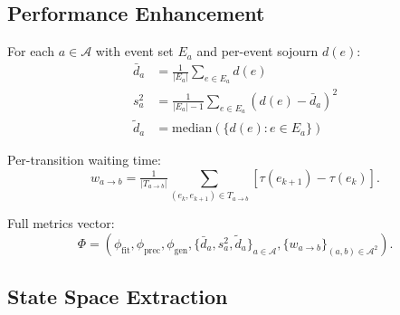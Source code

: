 \subsection{Performance Enhancement}
\label{sec:s2-enhancement}

\begin{definition}
\label{def:performance-metrics}
For each $a \in \mathcal{A}$ with event set $E_a$ and per-event sojourn
$d(e)$:
\begin{align}
\bar{d}_a   &= \tfrac{1}{|E_a|} \sum_{e \in E_a} d(e)   \label{eq:mean-sojourn} \\
s_a^2       &= \tfrac{1}{|E_a|-1} \sum_{e \in E_a} (d(e) - \bar{d}_a)^2 \label{eq:var-sojourn} \\
\tilde{d}_a &= \text{median}(\{d(e) : e \in E_a\})       \label{eq:median-sojourn}
\end{align}
\end{definition}

Per-transition waiting time:
\begin{equation}
\label{eq:waiting-time}
w_{a \to b} = \tfrac{1}{|T_{a \to b}|} \sum_{(e_k, e_{k+1}) \in T_{a \to b}}
    [\tau(e_{k+1}) - \tau(e_k)].
\end{equation}

Full metrics vector:
\begin{equation}
\label{eq:phi}
\Phi = \left( \phi_{\text{fit}}, \phi_{\text{prec}}, \phi_{\text{gen}},
    \{\bar{d}_a, s_a^2, \tilde{d}_a\}_{a \in \mathcal{A}},
    \{w_{a \to b}\}_{(a,b) \in \mathcal{A}^2} \right).
\end{equation}


\subsection{State Space Extraction}
\label{sec:s2-states}

